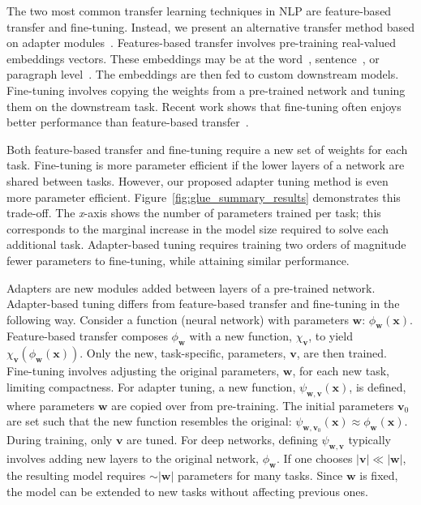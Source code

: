 The two most common transfer learning techniques in NLP are feature-based transfer and fine-tuning. Instead, we present an alternative transfer method based on adapter modules~\citep{rebuffi2017}. Features-based transfer involves pre-training real-valued embeddings vectors. These embeddings may be at the word~\citep{mikolov2013}, sentence~\citep{cer2019}, or paragraph level~\citep{le2014}. The embeddings are then fed to custom downstream models. Fine-tuning involves copying the weights from a pre-trained network and tuning them on the downstream task. Recent work shows that fine-tuning often enjoys better performance than feature-based transfer~\citep{howard2018universal}.

Both feature-based transfer and fine-tuning require a new set of weights for each task. Fine-tuning is more parameter efficient if the lower layers of a network are shared between tasks. However, our proposed adapter tuning method is even more parameter efficient.
Figure~\ref{fig:glue_summary_results} demonstrates this trade-off. The \emph{x}-axis shows the number of parameters trained per task; this corresponds to the marginal increase in the model size required to solve each additional task. Adapter-based tuning requires training two orders of magnitude fewer parameters to fine-tuning, while attaining similar performance.

Adapters are new modules added between layers of a pre-trained network. Adapter-based tuning differs from feature-based transfer and fine-tuning in the following way. Consider a function (neural network) with parameters $\bm w$: $\phi_{\bm w}(\bm x)$. Feature-based transfer composes $\phi_{\bm w}$ with a new function, $\chi_{\bm v}$, to yield $\chi_{\bm v}(\phi_{\bm w}(\bm x))$. Only the new, task-specific, parameters, $\bm v$, are then trained. Fine-tuning involves adjusting the original parameters, $\bm w$, for each new task, limiting compactness. For adapter tuning, a new function, $\psi_{\bm w, \bm v}(\bm x)$, is defined, where parameters $\bm w$ are copied over from pre-training. The initial parameters $\bm v_0$ are set such that the new function resembles the original: $\psi_{\bm w, \bm v_0}(\bm x) \approx \phi_{\bm w}(\bm x)$. During training, only $\bm v$ are tuned. For deep networks, defining $\psi_{\bm w, \bm v}$ typically involves adding new layers to the original network, $\phi_{\bm w}$. If one chooses $|\bm v|\ll|\bm w|$, the resulting model requires $\sim|\bm w|$ parameters for many tasks. Since $\bm w$ is fixed, the model can be extended to new tasks without affecting previous ones.

